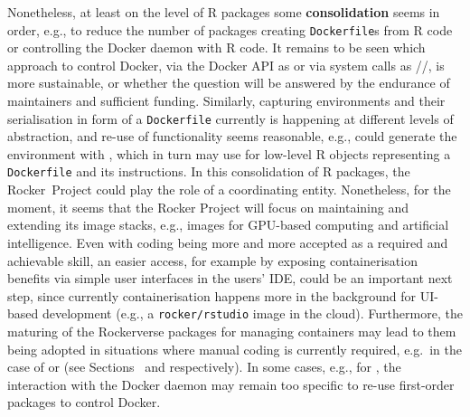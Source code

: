 Nonetheless, at least on the level of R packages some
\textbf{consolidation} seems in order, e.g., to reduce the number of
packages creating \texttt{Dockerfile}s from R code or controlling the
Docker daemon with R code. It remains to be seen which approach to
control Docker, via the Docker API as  or via system
calls as //, is more sustainable,
or whether the question will be answered by the endurance of maintainers
and sufficient funding. Similarly, capturing environments and their
serialisation in form of a \texttt{Dockerfile} currently is happening at
different levels of abstraction, and re-use of functionality seems
reasonable, e.g.,  could generate the environment with
, which in turn may use  for low-level
R objects representing a \texttt{Dockerfile} and its instructions. In
this consolidation of R packages, the Rocker~Project could play the role
of a coordinating entity. Nonetheless, for the moment, it seems that the
Rocker Project will focus on maintaining and extending its image stacks,
e.g., images for GPU-based computing and artificial intelligence. Even
with coding being more and more accepted as a required and achievable
skill, an easier access, for example by exposing containerisation
benefits via simple user interfaces in the users' IDE, could be an
important next step, since currently containerisation happens more in
the background for UI-based development (e.g., a \texttt{rocker/rstudio}
image in the cloud). Furthermore, the maturing of the Rockerverse
packages for managing containers may lead to them being adopted in
situations where manual coding is currently required, e.g.~in the case
of  or  (see Sections~ and
 respectively). In some cases, e.g., for ,
the interaction with the Docker daemon may remain too specific to re-use
first-order packages to control Docker.

